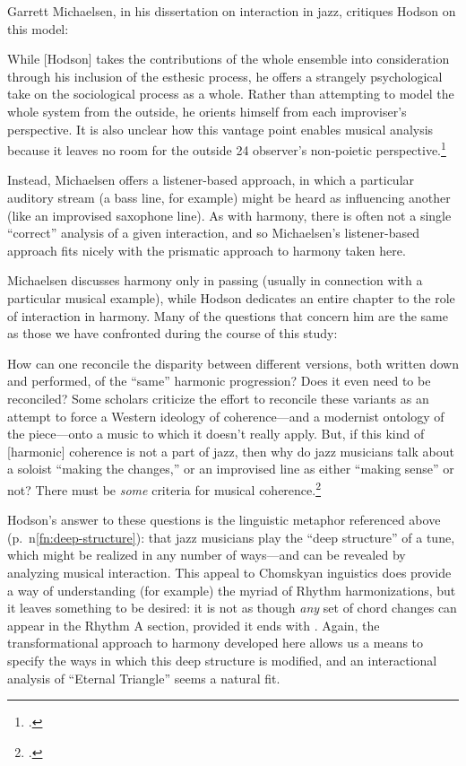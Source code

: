 Garrett Michaelsen, in his dissertation on interaction in jazz, critiques
Hodson on this model:%
\begin{quoting}
  \singlespacing
  While [Hodson] takes the contributions of the whole ensemble into consideration
  through his inclusion of the esthesic process, he offers a strangely
  psychological take on the sociological process as a whole. Rather than
  attempting to model the whole system from the outside, he orients himself
  from each improviser’s perspective. It is also unclear how this vantage
  point enables musical analysis because it leaves no room for the outside 24
  observer’s non-poietic perspective.\footcite[24--25]{michaelsen:2013}
\end{quoting}
%
Instead, Michaelsen offers a listener-based approach, in which a particular
auditory stream (a bass line, for example) might be heard as influencing
another (like an improvised saxophone line). As with harmony, there
is often not a single ``correct'' analysis of a given interaction, and so
Michaelsen's listener-based approach fits nicely with the prismatic approach
to harmony taken here.

Michaelsen discusses harmony only in passing (usually in connection with a
particular musical example), while Hodson dedicates an entire chapter to the
role of interaction in harmony. Many of the questions that concern
him are the same as those we have confronted during the course of this study:
\begin{quoting}
  \singlespacing
  How can one reconcile the disparity between different versions, both written
  down and performed, of the ``same'' harmonic progression? Does it even need
  to be reconciled? Some scholars criticize the effort to reconcile these
  variants as an attempt to force a Western ideology of coherence---and a
  modernist ontology of the piece---onto a music to which it doesn't really
  apply. But, if this kind of [harmonic] coherence is not a part of jazz, then
  why do jazz musicians talk about a soloist ``making the changes,'' or an
  improvised line as either ``making sense'' or not? There must be \emph{some}
  criteria for musical coherence.\footcite[53]{hodson:2007}
\end{quoting}
%
Hodson's answer to these questions is the linguistic metaphor referenced above
(p.~\pageref{fn:deep-structure}n\ref{fn:deep-structure}): that jazz musicians
play the ``deep structure'' of a tune, which might be realized in any number
of ways---and can be revealed by analyzing musical interaction. This appeal to
Chomskyan inguistics does provide a way of understanding (for example) the
myriad of Rhythm harmonizations, but it leaves something to be desired: it is
not as though \emph{any} set of chord changes can appear in the Rhythm A
section, provided it ends with \Bflat. Again, the transformational approach to
harmony developed here allows us a means to specify the ways in which this
deep structure is modified, and an interactional analysis of ``Eternal
Triangle'' seems a natural fit.

